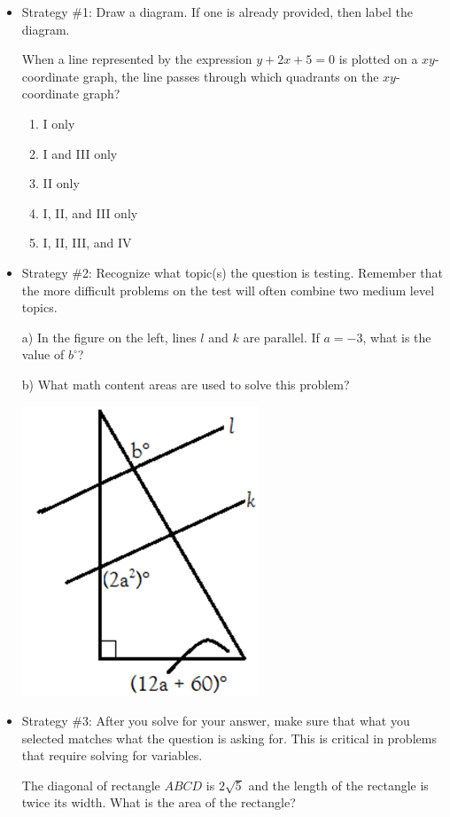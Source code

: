 \begin{itemize}
\item Strategy \#1: Draw a diagram. If one is already provided, then label the diagram.

\bigskip
\hrulefill

When a line represented by the expression $y+2x+5=0$ is plotted on a $xy$-coordinate graph, the line passes through which quadrants on the $xy$-coordinate graph?

\begin{enumerate}[label=(\Alph*)]
\item I only
\item I and III only
\item II only
\item I, II, and III only
\item I, II, III, and IV
\end{enumerate}

\hrulefill

\bigskip
\item Strategy \#2: Recognize what topic(s) the question is testing. Remember that the more difficult problems on the test will often combine two medium level topics.

\bigskip
\hrulefill

\begin{multicols}{2}
a) In the figure on the left, lines $l$ and $k$ are parallel. If $a=-3$, what is the value of $b^\circ$?

\vfill
b) What math content areas are used to solve this problem?

\vfill

\columnbreak
\centerline{\includegraphics{42}}
\end{multicols}
\hrulefill

\bigskip
\item Strategy \#3: After you solve for your answer, make sure that what you selected matches what the question is asking for. This is critical in problems that require solving for variables.

\bigskip
\hrulefill

The diagonal of rectangle $ABCD$ is $2\sqrt{5}$ and the length of the rectangle is twice its width. What is the area of the rectangle?

\vfill
\hrulefill
\end{itemize}

